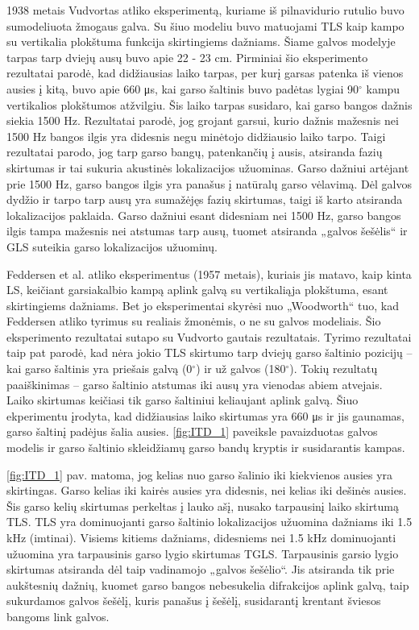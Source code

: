 \documentclass[]{vgtuef}
\begin{document}
1938 metais Vudvortas atliko eksperimentą, kuriame iš pilnavidurio rutulio buvo sumodeliuota žmogaus galva. Su šiuo modeliu buvo matuojami TLS kaip kampo su vertikalia plokštuma funkcija skirtingiems dažniams. Šiame galvos modelyje tarpas tarp dviejų ausų buvo apie 22 - 23 cm. Pirminiai šio eksperimento rezultatai parodė, kad didžiausias laiko tarpas, per kurį garsas patenka iš vienos ausies į kitą, buvo apie 660 μs, kai garso šaltinis buvo padėtas lygiai 90$^\circ$ kampu vertikalios plokštumos atžvilgiu. Šis laiko tarpas susidaro, kai garso bangos dažnis siekia 1500 Hz. Rezultatai parodė, jog grojant garsui, kurio dažnis mažesnis nei 1500 Hz bangos ilgis yra didesnis negu minėtojo didžiausio laiko tarpo. Taigi rezultatai parodo, jog tarp garso bangų, patenkančių į ausis, atsiranda fazių skirtumas ir tai sukuria akustinės lokalizacijos užuominas. Garso dažniui artėjant prie 1500 Hz, garso bangos ilgis yra panašus į natūralų garso vėlavimą. Dėl galvos dydžio ir tarpo tarp ausų yra sumažėjęs fazių skirtumas, taigi iš karto atsiranda lokalizacijos paklaida. Garso dažniui esant didesniam nei 1500 Hz, garso bangos ilgis tampa mažesnis nei atstumas tarp ausų, tuomet atsiranda „galvos šešėlis“   ir GLS suteikia garso lokalizacijos užuominų.

Feddersen et al. atliko eksperimentus (1957 metais), kuriais jis matavo, kaip kinta LS, keičiant garsiakalbio kampą aplink galvą su vertikaliąja plokštuma, esant skirtingiems dažniams. Bet jo eksperimentai skyrėsi nuo „Woodworth“ tuo, kad Feddersen atliko tyrimus su realiais žmonėmis, o ne su galvos modeliais. Šio eksperimento rezultatai sutapo su Vudvorto gautais rezultatais. Tyrimo rezultatai taip pat parodė, kad nėra jokio TLS skirtumo tarp dviejų garso šaltinio pozicijų – kai garso šaltinis yra priešais galvą (0$^\circ$) ir už galvos (180$^\circ$). Tokių rezultatų paaiškinimas – garso šaltinio atstumas iki ausų yra vienodas abiem atvejais. Laiko skirtumas keičiasi tik garso šaltiniui keliaujant aplink galvą. Šiuo ekperimentu įrodyta, kad didžiausias laiko skirtumas yra 660 μs ir jis gaunamas, garso šaltinį padėjus šalia ausies. \ref{fig:ITD_1} paveiksle pavaizduotas galvos modelis ir garso šaltinio skleidžiamų garso bandų kryptis ir susidarantis kampas.

\ref{fig:ITD_1} pav. matoma, jog kelias nuo garso šalinio iki kiekvienos ausies yra skirtingas. Garso kelias iki kairės ausies yra didesnis, nei kelias iki dešinės ausies. Šis garso kelių skirtumas perkeltas į lauko ašį, nusako tarpausinį laiko skirtumą TLS.
TLS yra dominuojanti garso šaltinio lokalizacijos užuomina dažniams iki 1.5 kHz (imtinai). Visiems kitiems dažniams, didesniems nei 1.5 kHz dominuojanti užuomina yra tarpausinis garso lygio skirtumas TGLS. Tarpausinis garsio lygio skirtumas atsiranda dėl taip vadinamojo „galvos šešėlio“. Jis atsiranda tik prie aukštesnių dažnių, kuomet garso bangos nebesukelia difrakcijos aplink galvą, taip sukurdamos galvos šešėlį, kuris panašus į šešėlį, susidarantį krentant šviesos bangoms link galvos.
\end{document}

